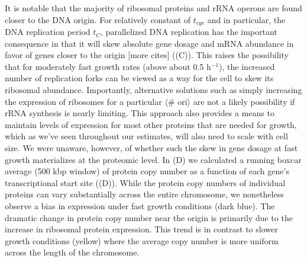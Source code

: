 It is notable that the majority of ribosomal proteins and rRNA operons are found
closer to the DNA origin. For relatively constant of $t_{cyc}$ and in
particular, the DNA replication  period $t_C$, parallelized DNA replication has
the important consequence in that it will skew absolute gene dosage and mRNA
abundance in favor of genes closer to the origin \citep{scholz2019} [more cites]
((C)). This raises the possibility that for
moderately fast growth rates (above about 0.5 h$^{-1}$), the increased number of
replication forks can be viewed as a way for the cell to skew its ribosomal
abundance. Importantly, alternative solutions such as simply increasing the
expression of ribosomes for a particular $\langle$\# ori$\rangle$ are not a
likely possibility if rRNA synthesis is nearly limiting. This approach also
provides a means to maintain levels of expression for most other proteins that
are needed  for growth, which as we've seen throughout our estimates, will also
need to scale with cell size. We were unaware, however, of whether such the skew
in  gene dosage at fast growth materializes at the proteomic level. In
(D) we calculated a running boxcar average (500 kbp
window) of protein copy number as a function of each gene's transcriptional
start site ((D)). While the protein copy numbers of
individual proteins can vary substantially across the entire chromosome, we
nonetheless observe a bias in expression under fast growth conditions (dark
blue). The dramatic change in protein copy number near the origin is primarily
due to the increase in ribosomal protein expression. This trend is in contrast
to slower growth conditions (yellow) where the average copy number is more
uniform across the length of the chromosome.


